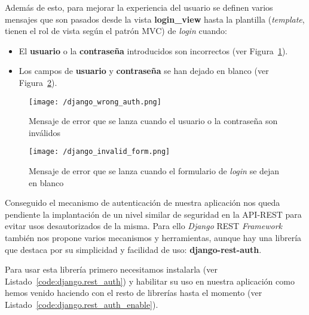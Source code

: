 



Además de esto, para mejorar la experiencia del usuario se definen varios mensajes que son pasados desde la vista \textbf{login\_view} hasta la plantilla (\textit{template}, tienen el rol de vista según el patrón \acs{MVC}) de \textit{login} cuando:

\begin{itemize}
\item El \textbf{usuario} o la \textbf{contraseña} introducidos son incorrectos (ver Figura~\ref{fig:django_wrong_auth}).
\item Los campos de \textbf{usuario} y \textbf{contraseña} se han dejado en blanco (ver Figura~\ref{fig:django_invalid_form}).
\end{itemize}

\begin{figure}[h]
\centering
\texttt{[image: /django\_wrong\_auth.png]}
\caption{Mensaje de error que se lanza cuando el usuario o la contraseña son inválidos}
\label{fig:django_wrong_auth}
\end{figure}

\begin{figure}[h]
\centering
\texttt{[image: /django\_invalid\_form.png]}
\caption{Mensaje de error que se lanza cuando el formulario de \textit{login} se dejan en blanco}
\label{fig:django_invalid_form}
\end{figure}

Conseguido el mecanismo de autenticación de nuestra aplicación nos queda pendiente la implantación de un nivel similar de seguridad en la \acs{API}-\acs{REST} para evitar usos desautorizados de la misma. Para ello \textit{Django} \acs{REST} \textit{Framework} también nos propone varios mecanismos y herramientas, aunque hay una librería que destaca por su simplicidad y facilidad de uso: \textbf{django-rest-auth}.

Para usar esta librería primero necesitamos instalarla (ver Listado~\ref{code:django.rest_auth}) y habilitar su uso en nuestra aplicación como hemos venido haciendo con el resto de librerías hasta el momento (ver Listado~\ref{code:django.rest_auth_enable}).

